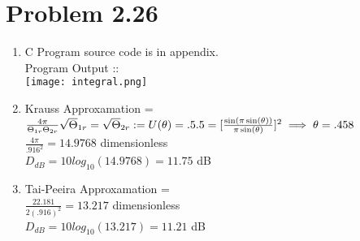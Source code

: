\documentclass[a4paper,15pt]{article}
\theoremstyle{mytheor}
\begin{document}
\section*{Problem 2.26}
\begin{enumerate}
\item  C Program source code is in appendix.\\
        Program Output :: \\
        \texttt{[image: integral.png]}
\item 
        Krauss Approxamation = $\frac{4\pi}{\Theta_{1r} \Theta_{2r}} \\
        \sqrt\Theta_{1r} = \sqrt\Theta_{2r} :=  U(\theta) = .5 \\
        .5 = [\frac{\sin(\pi\sin(\theta))}{\pi\sin(\theta)}]^2 \implies \theta = .458$\\
        $\frac{4\pi}{.916^2} = 14.9768$ dimensionless \\
        $D_{dB} = 10 log_{10} (14.9768) = 11.75$ dB\\
        
\item
        Tai-Peeira Approxamation = \\
        $\frac{22.181}{2(.916)^2} = 13.217$ dimensionless \\
        $D_{dB} = 10 log_{10} (13.217) = 11.21$ dB\\
\end{enumerate}
    
    \pagebreak
    
\end{document}

